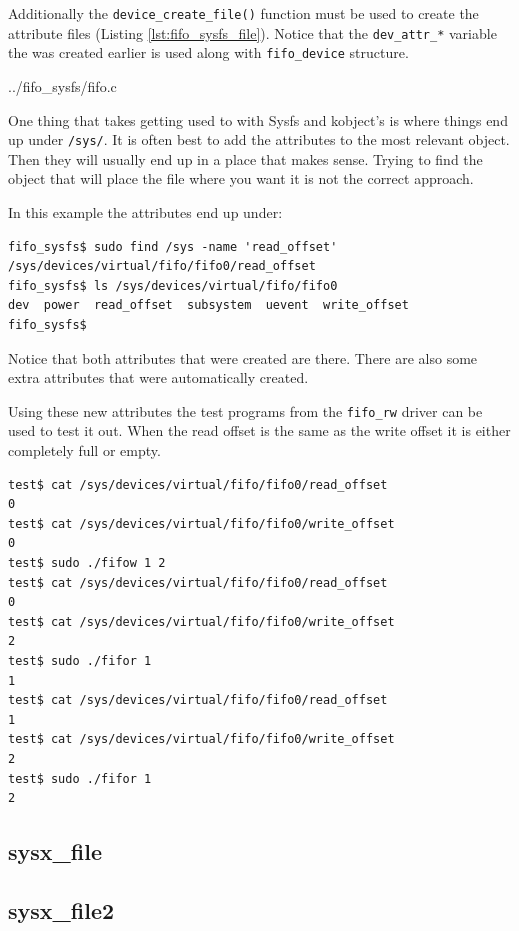 \documentclass{article}
\begin{document}
Additionally the \verb+device_create_file()+ function must be used
to create the attribute files (Listing \ref{lst:fifo_sysfs_file}).
Notice that the \verb+dev_attr_*+ variable the was created earlier
is used along with \verb+fifo_device+ structure.


	{../fifo_sysfs/fifo.c}

One thing that takes getting used to with Sysfs and kobject's is where
things end up under \verb+/sys/+.
It is often best to add the attributes to the most relevant object.
Then they will usually end up in a place that makes sense.
Trying to find the object that will place the file where you want it
is not the correct approach.

In this example the attributes end up under:

\begin{verbatim}
fifo_sysfs$ sudo find /sys -name 'read_offset'
/sys/devices/virtual/fifo/fifo0/read_offset
fifo_sysfs$ ls /sys/devices/virtual/fifo/fifo0
dev  power  read_offset  subsystem  uevent  write_offset
fifo_sysfs$ 
\end{verbatim}

Notice that both attributes that were created are there.
There are also some extra attributes that were automatically
created.

Using these new attributes the test programs from the \verb+fifo_rw+
driver can be used to test it out.  When the read offset is the
same as the write offset it is either completely full or empty.

\begin{verbatim}
test$ cat /sys/devices/virtual/fifo/fifo0/read_offset 
0
test$ cat /sys/devices/virtual/fifo/fifo0/write_offset 
0
test$ sudo ./fifow 1 2
test$ cat /sys/devices/virtual/fifo/fifo0/read_offset 
0
test$ cat /sys/devices/virtual/fifo/fifo0/write_offset 
2
test$ sudo ./fifor 1
1
test$ cat /sys/devices/virtual/fifo/fifo0/read_offset 
1
test$ cat /sys/devices/virtual/fifo/fifo0/write_offset 
2
test$ sudo ./fifor 1
2
\end{verbatim}


\clearpage
\subsection{sysx\_file}
\subsection{sysx\_file2}
\end{document}
